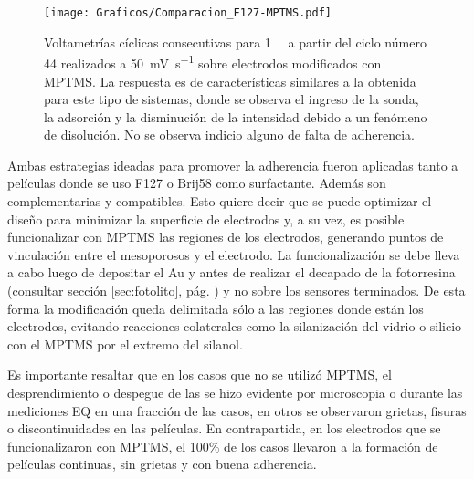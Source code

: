 					\begin{figure}[!ht]
							\begin{center}
				 	   	    \texttt{[image: Graficos/Comparacion\_F127-MPTMS.pdf]}
				       		\caption[Comparación de superficies con y sin MPTMS.]{Voltametrías cíclicas consecutivas para \aminorutenio\space \SI{1}{\milli\Molar} a partir del ciclo número 44 realizados a \SI{50}{\milli\volt.\second^{-1}} sobre electrodos modificados con MPTMS. La respuesta es de características similares a la obtenida para este tipo de sistemas, donde se observa el ingreso de la sonda, la adsorción y la disminución de la intensidad debido a un fenómeno de disolución. No se observa indicio alguno de falta de adherencia.}
						 \label{fig:comparaciones_MPTMS-B}	
					    \end{center}
					    \end{figure}
		
			 Ambas estrategias ideadas para promover la adherencia fueron aplicadas tanto a películas donde se uso F127 o Brij58\index{Brij58} como surfactante. Además son complementarias y compatibles. Esto quiere decir que se puede optimizar el diseño para minimizar la superficie de electrodos y, a su vez, es posible funcionalizar con MPTMS las regiones de los electrodos, generando puntos de vinculación entre el mesoporosos y el electrodo. La funcionalización se debe lleva a cabo luego de depositar el Au y antes de realizar el decapado de la fotorresina (consultar sección \ref{sec:fotolito}, pág. \pageref{sec:fotolito}) y no sobre los sensores terminados. De esta forma la modificación queda delimitada sólo a las regiones donde están los electrodos, evitando reacciones colaterales como la silanización del vidrio o silicio con el MPTMS por el extremo del silanol.

			 Es importante resaltar que en los casos que no se utilizó MPTMS, el desprendimiento o despegue de las \pdm\space se hizo evidente por microscopia o durante las mediciones EQ en una fracción de las casos, en otros se observaron grietas, fisuras o discontinuidades en las películas. En contrapartida, en los electrodos que se funcionalizaron con MPTMS, el 100\% de los casos llevaron a la formación de películas continuas, sin grietas y con buena adherencia.

